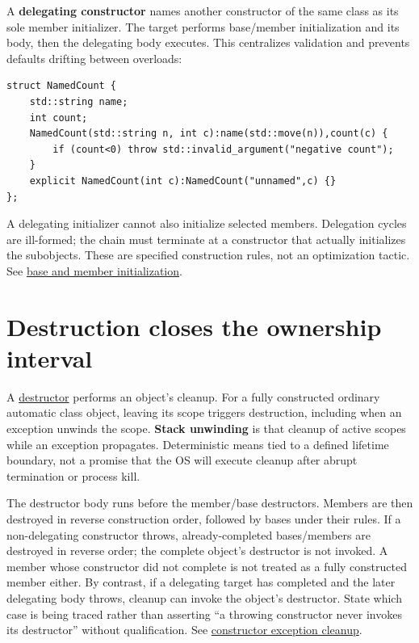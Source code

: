 A \textbf{delegating constructor} names another constructor of the same class as its sole member initializer. The target performs base/member initialization and its body, then the delegating body executes. This centralizes validation and prevents defaults drifting between overloads:

\begin{verbatim}
struct NamedCount {
    std::string name;
    int count;
    NamedCount(std::string n, int c):name(std::move(n)),count(c) {
        if (count<0) throw std::invalid_argument("negative count");
    }
    explicit NamedCount(int c):NamedCount("unnamed",c) {}
};
\end{verbatim}

A delegating initializer cannot also initialize selected members. Delegation cycles are ill-formed; the chain must terminate at a constructor that actually initializes the subobjects. These are specified construction rules, not an optimization tactic. See \href{https://eel.is/c++draft/class.base.init}{base and member initialization}.

\section{Destruction closes the ownership interval}\label{05-engine-i-ch003-destruction-closes-the-ownership-interval}

A \hyperref[appendix-9bfe377cef7a]{destructor} performs an object's cleanup. For a fully constructed ordinary automatic class object, leaving its scope triggers destruction, including when an exception unwinds the scope. \textbf{Stack unwinding} is that cleanup of active scopes while an exception propagates. Deterministic means tied to a defined lifetime boundary, not a promise that the OS will execute cleanup after abrupt termination or process kill.

The destructor body runs before the member/base destructors. Members are then destroyed in reverse construction order, followed by bases under their rules. If a non-delegating constructor throws, already-completed bases/members are destroyed in reverse order; the complete object's destructor is not invoked. A member whose constructor did not complete is not treated as a fully constructed member either. By contrast, if a delegating target has completed and the later delegating body throws, cleanup can invoke the object's destructor. State which case is being traced rather than asserting ``a throwing constructor never invokes its destructor'' without qualification. See \href{https://eel.is/c++draft/except.ctor}{constructor exception cleanup}.

